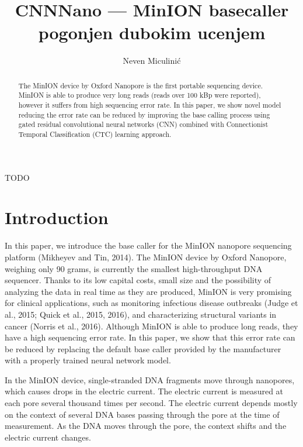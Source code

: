 \documentclass[times, utf8, seminar]{fer}
\begin{document}
\theoremstyle{definition}
\newtheorem{definition}{Definition}[section]

\title{CNNNano --- MinION  basecaller pogonjen dubokim ucenjem}
\author{Neven Miculinić}

\maketitle
\tableofcontents

\begin{sazetak}
TODO


\end{sazetak}

\begin{abstract}
    The MinION device by Oxford Nanopore is the first portable sequencing device. MinION is able to produce very long reads (reads over 100 kBp were reported), however it suffers from high sequencing error rate. In this paper, we show novel model reducing the error rate can be reduced by improving the base calling process using gated residual convolutional neural networks (CNN) combined with Connectionist Temporal Classification (CTC) learning approach.
\end{abstract}

\chapter{Introduction}

In this paper, we introduce the base caller for the MinION nanopore sequencing platform (Mikheyev and Tin, 2014).
The MinION device by Oxford Nanopore, weighing only 90 grams, is currently the smallest high-throughput DNA sequencer. Thanks to its low capital costs, small size and the possibility of analyzing the data in real time as they are produced, MinION is very promising for clinical applications, such as monitoring infectious disease outbreaks (Judge et al., 2015; Quick et al., 2015, 2016), and characterizing structural variants in cancer (Norris et al., 2016). Although MinION is able to produce long reads, they have a high sequencing error rate. In this paper, we show that this error rate can be reduced by replacing the default base caller provided by the manufacturer with a properly trained neural network model.

In the MinION device, single-stranded DNA fragments move through nanopores, which causes drops in the electric current. The electric current is measured at each pore several thousand times per second. The electric current depends mostly on the context of several DNA bases passing through the pore at the time of measurement. As the DNA moves through the pore, the context shifts and the electric current changes.
\end{document}
